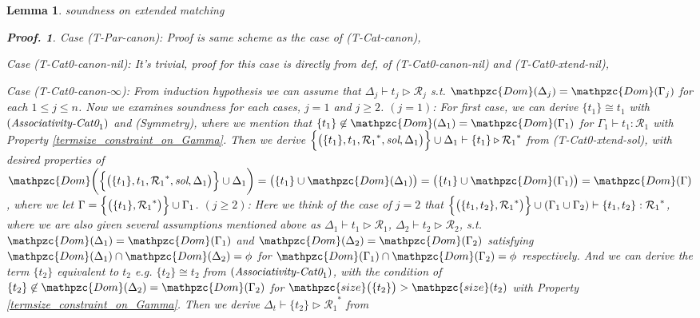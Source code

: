 \documentclass[12pt]{article}
\newtheorem{Lemma}{Lemma}[section]
\newtheorem{Proof}{Proof.}
\begin{document}
\begin{Lemma}{soundness on extended matching}
\begin{Proof}
    Case (T-Par-canon): Proof is same scheme as the case of
    (T-Cat-canon),
    
    Case (T-Cat0-canon-nil): It's trivial, proof for this case is directly
    from def, of (T-Cat0-canon-nil) and (T-Cat0-xtend-nil),
    
    Case (T-Cat0-canon-$\infty$): From induction hypothesis we can assume
    that $\Delta_j \vdash t_j \triangleright \mathcal{R}_j$ s.t.
    $\mathpzc{Dom}(\Delta_j) = \mathpzc{Dom}(\Gamma_j)$ for each
    $1 \le j \le n$. Now we examines soundness for each cases,
    $j = 1$ and $j \ge 2$.
    $(j = 1)$: For first case, we can derive $\{t_1\} \cong t_1$ with
    $(\text{\it Associativity-Cat0}_1)$ and (Symmetry), where we mention that
    $\{t_1\} \not\in \mathpzc{Dom}(\Delta_1) = \mathpzc{Dom}(\Gamma_1)$ for
    $\Gamma_1 \vdash t_1 : \mathcal{R}_1$ with
    Property \ref{termsize_constraint_on_Gamma}. Then we derive    
    $\Bigl\{\bigl(\{t_1\}, t_1, {\mathcal{R}_1}^*, \text{\it sol}, \Delta_1
    \bigr) \Bigr\} \cup \Delta_1 \vdash \{t_1\}
    \triangleright {\mathcal{R}_1}^*$ from (T-Cat0-xtend-sol),
    with desired properties of
    $\mathpzc{Dom}\biggl(\Bigl\{\bigl(\{t_1\}, t_1, {\mathcal{R}_1}^*,
    \text{\it sol}, \Delta_1 \bigr) \Bigr\} \cup \Delta_1 \biggr) =
    \bigl(\{t_1\} \cup \mathpzc{Dom}(\Delta_1) \bigr) =
    \bigl(\{t_1\} \cup \mathpzc{Dom}(\Gamma_1) \bigr) =
    \mathpzc{Dom}(\Gamma)$, where we let
    $\Gamma = \Bigl\{\bigl(\{t_1\}, {\mathcal{R}_1}^* \bigr) \Bigr\} \cup
    \Gamma_1$.
    $(j \ge 2)$: Here we think of the case of $j = 2$ that
    $\Bigl\{\bigl(\{t_1, t_2\}, {\mathcal{R}_1}^*\bigr) \Bigr\} \cup
    (\Gamma_1 \cup \Gamma_2) \vdash \{t_1, t_2\} : {\mathcal{R}_1}^*$,
    where we are also given several assumptions mentioned above as
    $\Delta_1 \vdash t_1 \triangleright \mathcal{R}_1$,
    $\Delta_2 \vdash t_2 \triangleright \mathcal{R}_2$, s.t.
    $\mathpzc{Dom}(\Delta_1) = \mathpzc{Dom}(\Gamma_1)$ and
    $\mathpzc{Dom}(\Delta_2) = \mathpzc{Dom}(\Gamma_2)$ satisfying
    $\mathpzc{Dom}(\Delta_1) \cap \mathpzc{Dom}(\Delta_2) = \phi$ for
    $\mathpzc{Dom}(\Gamma_1) \cap \mathpzc{Dom}(\Gamma_2) = \phi$
    respectively.
    And we can derive the term $\{t_2\}$ equivalent to $t_2$ e.g.
    $\{t_2\} \cong t_2$ from $(\text{\it Associativity-Cat0}_1)$, with
    the condition of
    $\{t_2\} \not\in \mathpzc{Dom}(\Delta_2) = \mathpzc{Dom}(\Gamma_2)$
    for $\mathpzc{size}\bigl(\{t_2\} \bigr) > \mathpzc{size}(t_2)$ with
    Property \ref{termsize_constraint_on_Gamma}. Then we derive
    $\Delta_t \vdash \{t_2\} \triangleright {\mathcal{R}_1}^*$ from

\end{Proof}
\end{Lemma}
\end{document}

